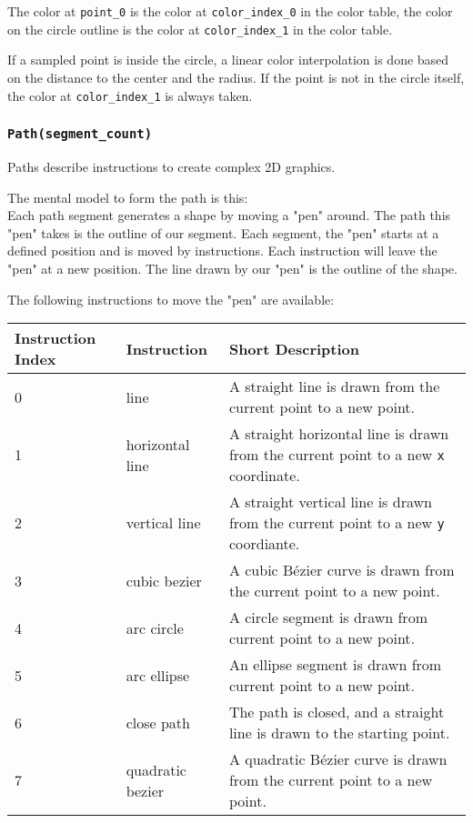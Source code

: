 \documentclass[]{article}
\begin{document}
The color at \texttt{point\_0} is the color at \texttt{color\_index\_0}
in the color table, the color on the circle outline is the color at
\texttt{color\_index\_1} in the color table.

If a sampled point is inside the circle, a linear color interpolation is
done based on the distance to the center and the radius. If the point is
not in the circle itself, the color at \texttt{color\_index\_1} is
always taken.

\hypertarget{pathsegment_count}{%
\subsubsection{\texorpdfstring{\texttt{Path(segment\_count)}}{Path(segment\_count)}}\label{pathsegment_count}}

Paths describe instructions to create complex 2D graphics.

The mental model to form the path is this:\\
Each path segment generates a shape by moving a "pen" around. The path
this "pen" takes is the outline of our segment. Each segment, the "pen"
starts at a defined position and is moved by instructions. Each
instruction will leave the "pen" at a new position. The line drawn by
our "pen" is the outline of the shape.

The following instructions to move the "pen" are available:

\begin{longtable}[]{@{}p{1in}p{2in}p{3in}@{}}
\toprule
Instruction Index & Instruction & Short Description \\
\midrule
\endhead
0 & line & A straight line is drawn from the current point to a new
point. \\
1 & horizontal line & A straight horizontal line is drawn from the
current point to a new \texttt{x} coordinate. \\
2 & vertical line & A straight vertical line is drawn from the current
point to a new \texttt{y} coordiante. \\
3 & cubic bezier & A cubic Bézier curve is drawn from the current point
to a new point. \\
4 & arc circle & A circle segment is drawn from current point to a new
point. \\
5 & arc ellipse & An ellipse segment is drawn from current point to a
new point. \\
6 & close path & The path is closed, and a straight line is drawn to the
starting point. \\
7 & quadratic bezier & A quadratic Bézier curve is drawn from the
current point to a new point. \\
\bottomrule
\end{longtable}
\end{document}
